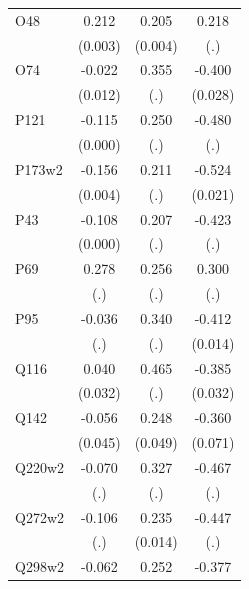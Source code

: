 \begin{table}[htbp]
\begin{tabular}{l*{3}{c}}
O48             &    0.212\sym{***}&    0.205\sym{***}&    0.218         \\
                &  (0.003)         &  (0.004)         &      (.)         \\
O74             &   -0.022\sym{*}  &    0.355         &   -0.400\sym{***}\\
                &  (0.012)         &      (.)         &  (0.028)         \\
P121            &   -0.115\sym{***}&    0.250         &   -0.480         \\
                &  (0.000)         &      (.)         &      (.)         \\
P173w2          &   -0.156\sym{***}&    0.211         &   -0.524\sym{***}\\
                &  (0.004)         &      (.)         &  (0.021)         \\
P43             &   -0.108\sym{***}&    0.207         &   -0.423         \\
                &  (0.000)         &      (.)         &      (.)         \\
P69             &    0.278         &    0.256         &    0.300         \\
                &      (.)         &      (.)         &      (.)         \\
P95             &   -0.036         &    0.340         &   -0.412\sym{***}\\
                &      (.)         &      (.)         &  (0.014)         \\
Q116            &    0.040         &    0.465         &   -0.385\sym{***}\\
                &  (0.032)         &      (.)         &  (0.032)         \\
Q142            &   -0.056         &    0.248\sym{***}&   -0.360\sym{***}\\
                &  (0.045)         &  (0.049)         &  (0.071)         \\
Q220w2          &   -0.070         &    0.327         &   -0.467         \\
                &      (.)         &      (.)         &      (.)         \\
Q272w2          &   -0.106         &    0.235\sym{***}&   -0.447         \\
                &      (.)         &  (0.014)         &      (.)         \\
Q298w2          &   -0.062\sym{***}&    0.252\sym{***}&   -0.377\sym{***}\\

\end{tabular}
\end{table}
